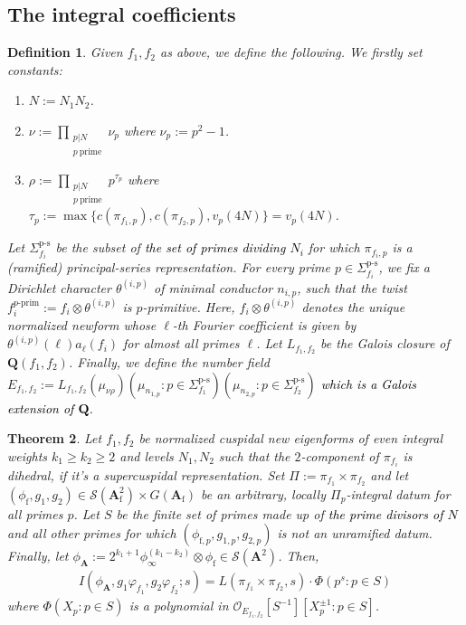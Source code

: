 \documentclass{amsart}
\theoremstyle{plain}
\newtheorem{thm}{Theorem}[subsection]
\theoremstyle{plain}
\newtheorem{defn}[thm]{Definition}
\theoremstyle{remark}
\begin{document}
\subsection{The integral coefficients}
\begin{defn}

Given $f_1,f_2$ as above, we define the following. We firstly set constants:
\begin{enumerate}
    \item$N:=N_1N_2$.
    \item$\nu:=\prod_{\substack{p|N\\ p\ \mathrm{prime}}}\nu_p$ where $\nu_p:=p^2-1$.
    \item$\rho:=\prod_{\substack{p|N\\ p\ \mathrm{prime}}}p^{\tau_p}$ where $\tau_p:=\max\{c(\pi_{f_1,p}),c(\pi_{f_2,p}),v_p(4N)\}=v_p(4N)$. 
\end{enumerate}
Let $\Sigma_{f_i}^{\mathrm{p\text{-}s}}$ be the subset of \textcolor{black}{the set of primes dividing $N_i$} for which $\pi_{f_i,p}$ is a (ramified) principal-series representation. For every prime $p\in \Sigma_{f_i}^{\mathrm{p\text{-}s}}$, we fix a Dirichlet character $\theta^{(i,p)}$ of minimal conductor $n_{i,p}$, such that the twist $f_i^{p\text{-}\mathrm{prim}}:=f_i\otimes\theta^{(i,p)}$ is $p$-primitive. Here, $f_i\otimes\theta^{(i,p)}$ denotes the unique normalized newform whose $\ell$-th Fourier coefficient is given by $\theta^{(i,p)}(\ell)a_\ell(f_i)$ for almost all primes $\ell$. Let $L_{f_1,f_2}$ be the Galois closure of $\mathbf{Q}(f_1,f_2)$. Finally, we define the number field $E_{f_1,f_2}:=L_{f_1,f_2}(\mu_{\nu\rho})(\mu_{n_{1,p}}:p\in\Sigma_{f_1}^{\mathrm{p\text{-}s}})(\mu_{n_{2,p}}:p\in \Sigma_{f_2}^{\mathrm{p\text{-}s}})$ \textcolor{black}{which is a Galois extension of $\mathbf{Q}$.}
\end{defn}
\begin{thm}\label{thm 5.2.2}
     Let $f_1,f_2$ be normalized cuspidal new eigenforms of even integral weights $k_1\geq k_2\geq 2$ and levels $N_1,N_2$ such that the $2$-component of $\pi_{f_i}$ is dihedral, if it's a supercuspidal representation. Set $\Pi:=\pi_{f_1}\times\pi_{f_2}$ and let $(\phi_\mathrm{f},g_1,g_2)\in \mathcal{S}(\mathbf{A}_\mathrm{f}^2)\times G(\mathbf{A}_\mathrm{f})$ be an arbitrary, locally $\Pi_p$-integral datum for all primes $p$. Let $S$ be the finite set of primes made up of \textcolor{black}{the prime divisors of $N$} and all other primes for which $(\phi_{\mathrm{f},p},g_{1,p},g_{2,p})$ is not an unramified datum. Finally, let $\phi_\mathbf{A}:=2^{k_1+1}\phi_\infty^{(k_1-k_2)}\otimes\phi_\mathrm{f}\in\mathcal
     S(\mathbf{A}^2)$. Then,
\begin{align*}
    I(\phi_\mathbf{A},g_1\varphi_{f_1},g_2\varphi_{f_2};s)=L(\pi_{f_1}\times\pi_{f_2},s)\cdot \Phi(p^s : p\in S)
\end{align*}
where $\Phi(X_p :p\in S)$ is a polynomial in $ \mathcal{O}_{E_{f_1,f_2}}[S^{-1}][X_p^{\pm1} : p\in S]$. 
\end{thm}
\end{document}
